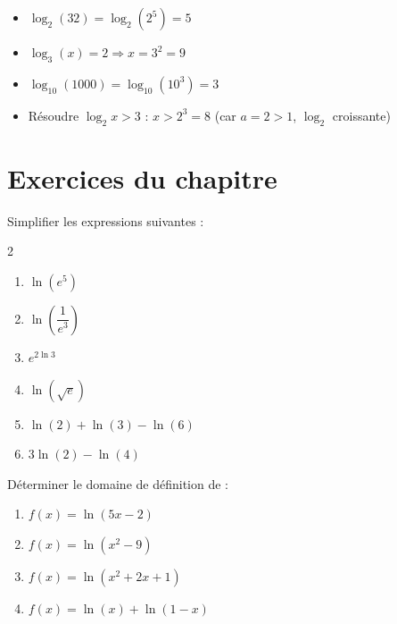 \begin{exemple}
  \begin{itemize}
    \item $\log_2(32) = \log_2(2^5) = 5$
    \medskip
    \item $\log_3(x) = 2 \Rightarrow x = 3^2 = 9$
    \medskip
    \item $\log_{10}(1000) = \log_{10}(10^3) = 3$
    \medskip
    \item R\'{e}soudre $\log_2 x > 3$ :
    \quad $x > 2^3 = 8$ \quad (car $a = 2 > 1$, $\log_2$ croissante)
  \end{itemize}
\end{exemple}

\newpage
\section*{Exercices du chapitre}

\begin{exercice}
  Simplifier les expressions suivantes :
  \begin{multicols}{2}
  \begin{enumerate}
    \item $\ln(e^5)$
    \item $\ln\!\left(\dfrac{1}{e^3}\right)$
    \item $e^{2\ln 3}$
    \item $\ln(\sqrt{e})$
    \item $\ln(2) + \ln(3) - \ln(6)$
    \item $3\ln(2) - \ln(4)$
  \end{enumerate}
  \end{multicols}
\end{exercice}

\begin{exercice}
  D\'{e}terminer le domaine de d\'{e}finition de :
  \begin{enumerate}
    \item $f(x) = \ln(5x - 2)$
    \item $f(x) = \ln(x^2 - 9)$
    \item $f(x) = \ln(x^2 + 2x + 1)$
    \item $f(x) = \ln(x) + \ln(1-x)$
  \end{enumerate}
\end{exercice}

